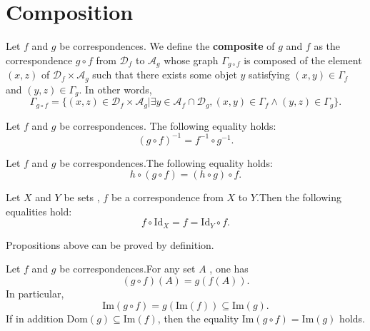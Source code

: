 \documentclass{book}
\numberwithin{equation}{section}
\begin{document}
\section{Composition}
\begin{definitionenv}
    Let $f$ and $g$ be correspondences. We define the \textbf{composite } of $g$ and $f$ as the correspondence $g\circ f$ from $\mathscr{D}_f$  to $\mathscr{A}_g$ whose graph $\Gamma_{g\circ f }$ is composed of the element $(x, z)$ of $\mathscr{D}_f\times \mathscr{A}_g$ such that there exists some objet $y$ satisfying $(x, y)\in \Gamma_f $ and $(y, z)\in \Gamma_g$. In other words, 
    $$\Gamma_{g\circ f }=\{(x, z)\in \mathscr{D}_f\times \mathscr{A}_g|\exists y\in \mathscr{A}_f\cap\mathscr{D}_g, (x, y)\in \Gamma_f \wedge (y, z)\in \Gamma_g\}.$$
\end{definitionenv}
\begin{propositionenv}
    Let $f$ and $g$ be correspondences. The following equality holds:
    \begin{equation}
        (g\circ f)^{-1}=f^{-1}\circ g^{-1}.
    \end{equation}
\end{propositionenv}
\begin{propositionenv}\label{proposition3.4.2}
    Let $f$ and $g$ be correspondences.The following equality holds:
    \begin{equation}
        h\circ (g\circ f)=(h\circ g)\circ f.
    \end{equation}
\end{propositionenv}
\begin{propositionenv}\label{proposition3.4.3}
    Let $X$ and $Y$ be sets , $f$ be a correspondence from $X$ to $Y$.Then the following equalities hold:
    $$f\circ \mathrm{Id}_X=f=\mathrm{Id}_Y\circ f.$$
\end{propositionenv}
Propositions above can be proved by definition.
\begin{propositionenv}\label{proposition3.4.4}
    Let $f$ and $g$ be correspondences.For any set $A$ , one has 
    $$(g\circ f)(A)=g(f(A)).$$
    In particular, 
    $$\mathrm{Im}(g\circ f)=g(\mathrm{Im}(f))\subseteq \mathrm{Im}(g).$$
    If in addition $\mathrm{Dom}(g)\subseteq \mathrm{Im}(f)$,  then the equality $\mathrm{Im}(g\circ f)=\mathrm{Im}(g)$ holds.
\end{propositionenv}
\end{document}
